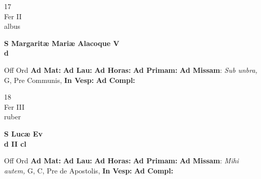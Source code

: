 \documentclass[10pt, openany]{book}
\begin{document}
    \begin{center}
        \begin{minipage}{3.5in}
            \vspace{2em}
            \begin{minipage}{0.5in}
                {\Huge 17} \\
                {\normalsize Fer II} \\
                {\normalsize albus}
            \end{minipage}
            \begin{minipage}{3.0in}
                \textbf{ \large S Margaritæ Mariæ Alacoque V \\
                \textnormal{\normalsize d}} \\ 
            \end{minipage}
            \begin{justify}Off Ord
                \textbf{Ad Mat: }
                \textbf{Ad Lau: }
                \textbf{Ad Horas: }
                \textbf{Ad Primam: }\textbf{Ad Missam}: \textit{Sub unbra,} G, Pre Communis,  
                \textbf{In Vesp: }
                \textbf{Ad Compl: }
            \end{justify}
        \end{minipage}
    \end{center}

    \begin{center}
        \begin{minipage}{3.5in}
            \vspace{2em}
            \begin{minipage}{0.5in}
                {\Huge 18} \\
                {\normalsize Fer III} \\
                {\normalsize ruber}
            \end{minipage}
            \begin{minipage}{3.0in}
                \textbf{ \large S Lucæ Ev \\
                \textnormal{\normalsize d II cl}} \\ 
            \end{minipage}
            \begin{justify}Off Ord
                \textbf{Ad Mat: }
                \textbf{Ad Lau: }
                \textbf{Ad Horas: }
                \textbf{Ad Primam: }\textbf{Ad Missam}: \textit{Mihi autem,} G, C, Pre de Apostolis,  
                \textbf{In Vesp: }
                \textbf{Ad Compl: }
            \end{justify}
        \end{minipage}
    \end{center}
\end{document}
